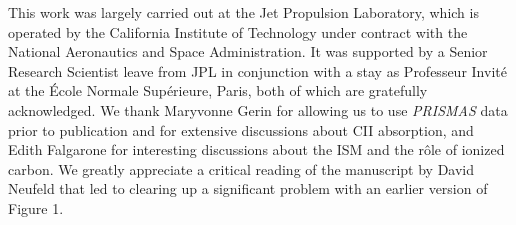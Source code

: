 \documentclass[12pt]{aastex}
\begin{document}
\newpage

This work was largely carried out at the Jet Propulsion Laboratory, which is operated by the California Institute of Technology under contract with the National Aeronautics and Space Administration.  It was supported by a Senior Research Scientist leave from JPL in conjunction with a stay as Professeur Invit\'{e} at the \'{E}cole Normale Sup\'{e}rieure, Paris, both of which are gratefully acknowledged.  We thank Maryvonne Gerin for allowing us to use {\it PRISMAS} data prior to publication and for extensive discussions about CII absorption, and Edith Falgarone for interesting discussions about the ISM and the r\^{o}le of ionized carbon.  We greatly appreciate a critical reading of the manuscript by David Neufeld that led to clearing up a significant problem with an earlier version of Figure 1.

\end{document}
